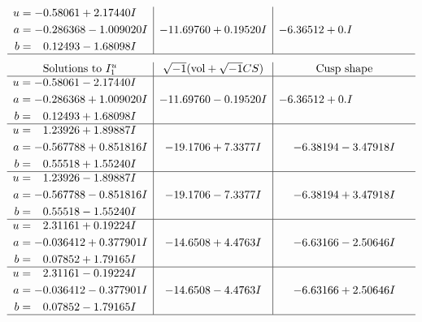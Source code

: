 \documentclass[1p]{elsarticle_modified}
\theoremstyle{definition}
\newcommand{\I}{\sqrt{-1}}
\begin{document}
$$\begin{array}{c|c|c}
\begin{aligned}
u &= -0.58061 + 2.17440 I \\
a &= -0.286368 - 1.009020 I \\
b &= \phantom{-}0.12493 - 1.68098 I\end{aligned}
 & -11.69760 + 0.19520 I & -6.36512 + 0. I\phantom{ +0.000000I}\\
 \hline 
 \end{array}$$\newpage$$\begin{array}{c|c|c}  
\text{Solutions to }I^u_{1}& \I (\text{vol} + \sqrt{-1}CS) & \text{Cusp shape}\\
 \hline 
\begin{aligned}
u &= -0.58061 - 2.17440 I \\
a &= -0.286368 + 1.009020 I \\
b &= \phantom{-}0.12493 + 1.68098 I\end{aligned}
 & -11.69760 - 0.19520 I & -6.36512 + 0. I\phantom{ +0.000000I} \\ \hline\begin{aligned}
u &= \phantom{-}1.23926 + 1.89887 I \\
a &= -0.567788 + 0.851816 I \\
b &= \phantom{-}0.55518 + 1.55240 I\end{aligned}
 & -19.1706 + 7.3377 I & -6.38194 - 3.47918 I \\ \hline\begin{aligned}
u &= \phantom{-}1.23926 - 1.89887 I \\
a &= -0.567788 - 0.851816 I \\
b &= \phantom{-}0.55518 - 1.55240 I\end{aligned}
 & -19.1706 - 7.3377 I & -6.38194 + 3.47918 I \\ \hline\begin{aligned}
u &= \phantom{-}2.31161 + 0.19224 I \\
a &= -0.036412 + 0.377901 I \\
b &= \phantom{-}0.07852 + 1.79165 I\end{aligned}
 & -14.6508 + 4.4763 I & -6.63166 - 2.50646 I \\ \hline\begin{aligned}
u &= \phantom{-}2.31161 - 0.19224 I \\
a &= -0.036412 - 0.377901 I \\
b &= \phantom{-}0.07852 - 1.79165 I\end{aligned}
 & -14.6508 - 4.4763 I & -6.63166 + 2.50646 I\\
 \hline 
 \end{array}$$\newpage\newpage\renewcommand{\arraystretch}{1}
\end{document}
